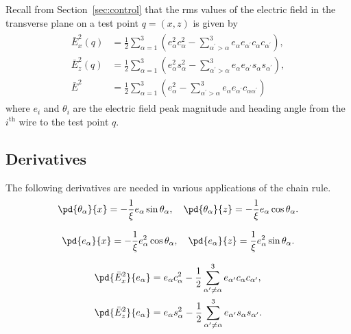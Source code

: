 \appendix

\noindent Recall from Section~\ref{sec:control} that the rms values of the
electric field in the transverse plane on a test point $q = (x, z)$ is given by
%
\begin{align*}
    \begin{split}
        \bar{E}_{x}^2(q) &=
        \frac{1}{2}\sum_{\alpha=1}^3\left(e_{\alpha}^2c_\alpha^2 -
            \sum_{\alpha^\prime > \alpha}^3e_{\alpha}
    e_{\alpha^\prime} c_{\alpha}c_{\alpha^\prime} \right), \\
        \bar{E}_{z}^2(q) &= \frac{1}{2}\sum_{\alpha=1}^3\left( e_{\alpha
            }^2s_\alpha^2 - \sum_{\alpha^\prime > \alpha}^3e_{\alpha}
    e_{\alpha^\prime} s_{\alpha}s_{\alpha^\prime}\right),
    \\
    \bar{E}^2 &= \frac{1}{2}\sum_{\alpha=1}^3\left(e_\alpha^2 -
    \sum_{\alpha^\prime > \alpha}^3 e_\alpha
    e_{\alpha^\prime} c_{\alpha \alpha^\prime}\right)
    \end{split}
\end{align*}
%
where $e_i$ and $\theta_i$ are the electric field peak magnitude and heading
angle from the $i^{\text{th}}$ wire to the test point $q$. 


\subsection{Derivatives}
\label{ssec:derivatives}

The following derivatives are needed in various applications of the chain rule.
%
\begin{equation*}
    \pd{\theta_\alpha}{x} = -\frac{1}{\xi}e_\alpha\sin{\theta_\alpha}, \quad
    \pd{\theta_\alpha}{z} = -\frac{1}{\xi}e_\alpha\cos{\theta_\alpha}.
\end{equation*}

\begin{equation*}
    \pd{e_\alpha}{x} = -\frac{1}{\xi}e_\alpha^2\cos{\theta_\alpha}, \quad
    \pd{e_\alpha}{z} = \frac{1}{\xi}e_\alpha^2\sin{\theta_\alpha}.
\end{equation*}

\begin{align*}
    \pd{\bar{E}_x^2}{e_\alpha} &= e_\alpha c_\alpha^2 -
    \frac{1}{2}\sum_{\alpha^\prime \neq \alpha}^3 e_{\alpha^\prime} c_\alpha
    c_{\alpha^\prime}, \\
    \pd{\bar{E}_z^2}{e_\alpha} &= e_\alpha s_\alpha^2 -
    \frac{1}{2}\sum_{\alpha^\prime \neq \alpha}^3 e_{\alpha^\prime} s_\alpha
    s_{\alpha^\prime}.
\end{align*}

